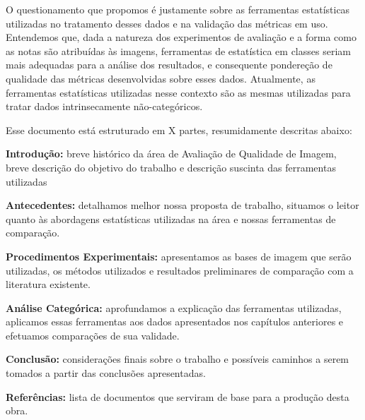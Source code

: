 	O questionamento que propomos é justamente sobre as ferramentas estatísticas utilizadas no tratamento desses dados e na validação das métricas em uso. Entendemos que, dada a natureza dos experimentos de avaliação e a forma como as notas são atribuídas às imagens, ferramentas de estatística em classes seriam mais adequadas para a análise dos resultados, e consequente pondereção de qualidade das métricas desenvolvidas sobre esses dados. Atualmente, as ferramentas estatísticas utilizadas nesse contexto são as mesmas utilizadas para tratar dados intrinsecamente não-categóricos.

	

	Esse documento está estruturado em X partes, resumidamente descritas abaixo:

\begin{description}
\item{\textbf{Introdução:} } breve histórico da área de Avaliação de Qualidade de Imagem, breve descrição do objetivo do trabalho e descrição suscinta das ferramentas utilizadas
\item{\textbf{Antecedentes:} } detalhamos melhor nossa proposta de trabalho, situamos o leitor quanto às abordagens estatísticas utilizadas na área e nossas ferramentas de comparação.
\item{\textbf{Procedimentos Experimentais:} } apresentamos as bases de imagem que serão utilizadas, os métodos utilizados e resultados preliminares de comparação com a literatura existente.
\item{\textbf{Análise Categórica:} } aprofundamos a explicação das ferramentas utilizadas, aplicamos essas ferramentas aos dados apresentados nos capítulos anteriores e efetuamos comparações de sua validade.
\item{\textbf{Conclusão:} } considerações finais sobre o trabalho e possíveis caminhos a serem tomados a partir das conclusões apresentadas.
\item{\textbf{Referências:} } lista de documentos que serviram de base para a produção desta obra.
\end{description}
